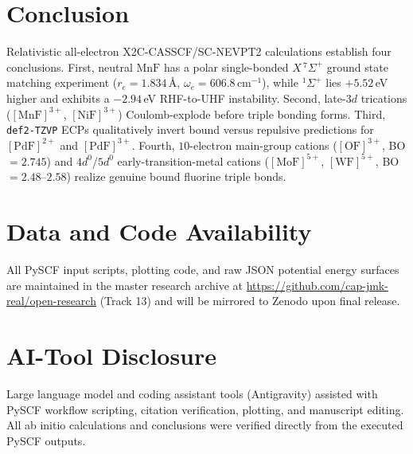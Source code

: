 \documentclass[10pt,twocolumn]{article}
\begin{document}
\section{Conclusion}
Relativistic all-electron X2C-CASSCF/SC-NEVPT2 calculations establish four conclusions. First, neutral $\mathrm{MnF}$ has a polar single-bonded $X\,^7\Sigma^+$ ground state matching experiment ($r_e = 1.834\,$\AA, $\omega_e = 606.8\,\mathrm{cm}^{-1}$), while $^1\Sigma^+$ lies $+5.52\,$eV higher and exhibits a $-2.94\,$eV RHF-to-UHF instability. Second, late-$3d$ trications ($[\mathrm{MnF}]^{3+}$, $[\mathrm{NiF}]^{3+}$) Coulomb-explode before triple bonding forms. Third, \texttt{def2-TZVP} ECPs qualitatively invert bound versus repulsive predictions for $[\mathrm{PdF}]^{2+}$ and $[\mathrm{PdF}]^{3+}$. Fourth, $10$-electron main-group cations ($[\mathrm{OF}]^{3+}$, BO $= 2.745$) and $4d^0$/$5d^0$ early-transition-metal cations ($[\mathrm{MoF}]^{5+}$, $[\mathrm{WF}]^{5+}$, BO $= 2.48$--$2.58$) realize genuine bound fluorine triple bonds.

\section*{Data and Code Availability}
All PySCF input scripts, plotting code, and raw JSON potential energy surfaces are maintained in the master research archive at \url{https://github.com/cap-jmk-real/open-research} (Track 13) and will be mirrored to Zenodo upon final release.

\section*{AI-Tool Disclosure}
Large language model and coding assistant tools (Antigravity) assisted with PySCF workflow scripting, citation verification, plotting, and manuscript editing. All ab initio calculations and conclusions were verified directly from the executed PySCF outputs.
\end{document}

